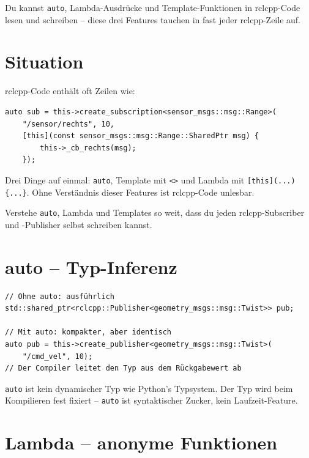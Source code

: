 \begin{lernziele}
Du kannst \texttt{auto}, Lambda-Ausdrücke und Template-Funktionen
in rclcpp-Code lesen und schreiben --
diese drei Features tauchen in fast jeder rclcpp-Zeile auf.
\end{lernziele}

\section{Situation}

rclcpp-Code enthält oft Zeilen wie:

\begin{lstlisting}[style=cpp]
auto sub = this->create_subscription<sensor_msgs::msg::Range>(
    "/sensor/rechts", 10,
    [this](const sensor_msgs::msg::Range::SharedPtr msg) {
        this->_cb_rechts(msg);
    });
\end{lstlisting}

Drei Dinge auf einmal: \texttt{auto}, Template mit \texttt{<>}
und Lambda mit \texttt{[this](...)\{...\}}.
Ohne Verständnis dieser Features ist rclcpp-Code unlesbar.

\begin{aufgabeBox}
Verstehe \texttt{auto}, Lambda und Templates so weit,
dass du jeden rclcpp-Subscriber und -Publisher selbst schreiben kannst.
\end{aufgabeBox}

\section{auto -- Typ-Inferenz}

\begin{lstlisting}[style=cpp]
// Ohne auto: ausführlich
std::shared_ptr<rclcpp::Publisher<geometry_msgs::msg::Twist>> pub;

// Mit auto: kompakter, aber identisch
auto pub = this->create_publisher<geometry_msgs::msg::Twist>(
    "/cmd_vel", 10);
// Der Compiler leitet den Typ aus dem Rückgabewert ab
\end{lstlisting}

\texttt{auto} ist kein dynamischer Typ wie Python's Typsystem.
Der Typ wird beim Kompilieren fest fixiert --
\texttt{auto} ist syntaktischer Zucker,
kein Laufzeit-Feature.

\section{Lambda -- anonyme Funktionen}

